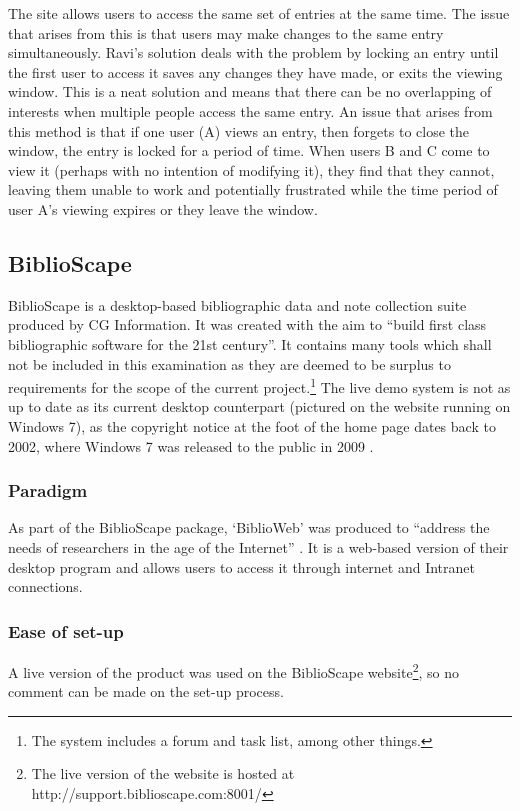 \documentclass{l4proj}
\begin{document}
The site allows users to access the same set of entries at the same time.  The issue that arises from this is that users may make changes to the same entry simultaneously.  Ravi's solution deals with the problem by locking an entry until the first user to access it saves any changes they have made, or exits the viewing window.  This is a neat solution and means that there can be no overlapping of interests when multiple people access the same entry.  An issue that arises from this method is that if one user (A) views an entry, then forgets to close the window, the entry is locked for a period of time.  When users B and C come to view it (perhaps with no intention of modifying it), they find that they cannot, leaving them unable to work and potentially frustrated while the time period of user A's viewing expires or they leave the window.

\subsection{BiblioScape}
BiblioScape is a desktop-based bibliographic data and note collection suite produced by CG Information.  It was created with the aim to ``build first class bibliographic software for the 21st century''.  It contains many tools which shall not be included in this examination as they are deemed to be surplus to requirements for the scope of the current project.\footnote{The system includes a forum and task list, among other things.} The live demo system is not as up to date as its current desktop counterpart (pictured on the website running on Windows 7), as the copyright notice at the foot of the home page dates back to 2002, where Windows 7 was released to the public in 2009 \cite{Win7Release}.
\subsubsection{Paradigm}
As part of the BiblioScape package, `BiblioWeb' was produced to ``address the needs of researchers in the age of the Internet'' \cite{BiblioWebWhy}.  It is a web-based version of their desktop program and allows users to access it through internet and Intranet connections.
\subsubsection{Ease of set-up}
A live version of the product was used on the BiblioScape website\footnote{The live version of the website is hosted at http://support.biblioscape.com:8001/}, so no comment can be made on the set-up process.
\end{document}
